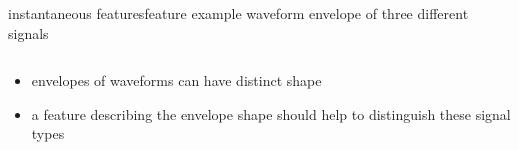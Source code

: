         \begin{frame}{instantaneous features}{feature example}
            waveform envelope of three different signals 
            
            
            \vspace{-2mm}
            \begin{columns}
                \centering
                \centering
                \centering
            \end{columns}
            
            \bigskip
            \begin{itemize}
                \item<2->   envelopes of waveforms can have distinct shape
                \item<3->[$\Rightarrow$] a feature describing the envelope shape should help to distinguish these signal types
            \end{itemize}
        \end{frame}

